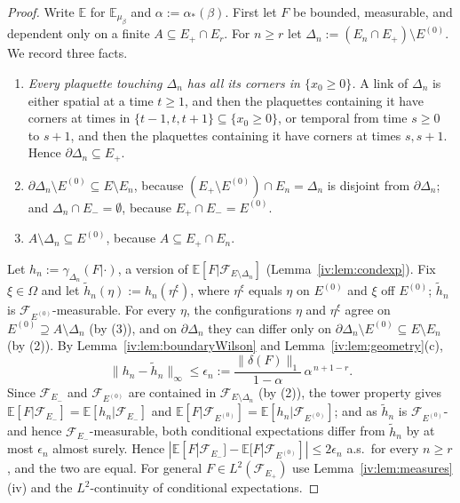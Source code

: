 \documentclass[11pt,a4paper]{article}
\theoremstyle{definition}
\theoremstyle{remark}
\newcommand{\E}{\mathbb{E}}
\newcommand{\cF}{\mathcal{F}}
\newcommand{\norm}[1]{\lVert #1\rVert}
\newcommand{\aS}{\alpha_*}
\begin{document}
\begin{proof}
Write $\E$ for $\E_{\mu_\beta}$ and $\alpha:=\aS(\beta)$. First let $F$ be bounded, measurable, and dependent only on a finite
$A\subseteq E_+\cap E_r$. For $n\ge r$ let $\Delta_n:=(E_n\cap E_+)\setminus E^{(0)}$. We record three facts.
\begin{enumerate}[label=(\arabic*)]
\item \emph{Every plaquette touching $\Delta_n$ has all its corners in $\{x_0\ge0\}$.} A link of $\Delta_n$ is either spatial
at a time $t\ge1$, and then the plaquettes containing it have corners at times in $\{t-1,t,t+1\}\subseteq\{x_0\ge0\}$, or
temporal from time $s\ge0$ to $s+1$, and then the plaquettes containing it have corners at times $s,s+1$. Hence
$\partial\Delta_n\subseteq E_+$.
\item $\partial\Delta_n\setminus E^{(0)}\subseteq E\setminus E_n$, because $(E_+\setminus E^{(0)})\cap E_n=\Delta_n$ is disjoint from
$\partial\Delta_n$; and $\Delta_n\cap E_-=\emptyset$, because $E_+\cap E_-=E^{(0)}$.
\item $A\setminus\Delta_n\subseteq E^{(0)}$, because $A\subseteq E_+\cap E_n$.
\end{enumerate}
Let $h_n:=\gamma_{\Delta_n}(F|\cdot)$, a version of $\E[F|\cF_{E\setminus\Delta_n}]$ (Lemma~\ref{iv:lem:condexp}). Fix $\xi\in\Omega$
and let $\tilde h_n(\eta):=h_n(\eta^\xi)$, where $\eta^\xi$ equals $\eta$ on $E^{(0)}$ and $\xi$ off $E^{(0)}$; $\tilde h_n$ is
$\cF_{E^{(0)}}$-measurable. For every $\eta$, the configurations $\eta$ and $\eta^\xi$ agree on $E^{(0)}\supseteq A\setminus\Delta_n$ (by
(3)), and on $\partial\Delta_n$ they can differ only on $\partial\Delta_n\setminus E^{(0)}\subseteq E\setminus E_n$ (by (2)). By
Lemma~\ref{iv:lem:boundaryWilson} and Lemma~\ref{iv:lem:geometry}(c),
\[
\norm{h_n-\tilde h_n}_\infty\le\epsilon_n:=\frac{\norm{\delta(F)}_1}{1-\alpha}\,\alpha^{\,n+1-r}.
\]
Since $\cF_{E_-}$ and $\cF_{E^{(0)}}$ are contained in $\cF_{E\setminus\Delta_n}$ (by (2)), the tower property gives
$\E[F|\cF_{E_-}]=\E[h_n|\cF_{E_-}]$ and $\E[F|\cF_{E^{(0)}}]=\E[h_n|\cF_{E^{(0)}}]$; and as $\tilde h_n$ is $\cF_{E^{(0)}}$- and hence
$\cF_{E_-}$-measurable, both conditional expectations differ from $\tilde h_n$ by at most $\epsilon_n$ almost surely. Hence
$|\E[F|\cF_{E_-}]-\E[F|\cF_{E^{(0)}}]|\le2\epsilon_n$ a.s.\ for every $n\ge r$, and the two are equal. For general
$F\in L^2(\cF_{E_+})$ use Lemma~\ref{iv:lem:measures}(iv) and the $L^2$-continuity of conditional expectations.
\end{proof}
\end{document}

